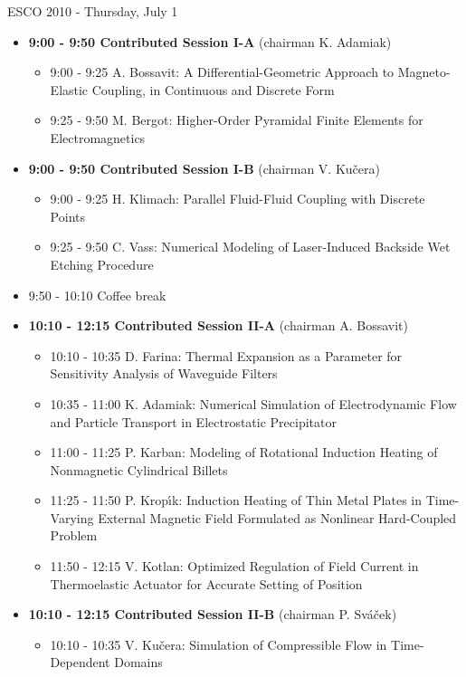 \documentclass[10pt, A4]{article}%
\begin{document}
\centerline{\huge ESCO 2010 - Thursday, July 1}
\vspace{4mm}

\begin{itemize}    
  \item {\bf 9:00 - 9:50 Contributed Session I-A} (chairman K. Adamiak) 
  \begin{itemize}
    \item 9:00 - 9:25 A. Bossavit: A Differential-Geometric Approach to Magneto-Elastic Coupling, 
in Continuous and Discrete Form
    \item 9:25 - 9:50 M. Bergot: Higher-Order Pyramidal Finite Elements for Electromagnetics
  \end{itemize}
  \item {\bf 9:00 - 9:50 Contributed Session I-B} (chairman V. Ku\v cera) 
  \begin{itemize}
    \item 9:00 - 9:25 H. Klimach: Parallel Fluid-Fluid Coupling with Discrete Points
    \item 9:25 - 9:50 C. Vass: Numerical Modeling  of  Laser-Induced  Backside  Wet  Etching Procedure
  \end{itemize}
  \item 9:50 - 10:10 Coffee break
  \item {\bf 10:10 - 12:15 Contributed Session II-A} (chairman A. Bossavit) 
  \begin{itemize}
    \item 10:10 - 10:35 D. Farina: Thermal Expansion as a Parameter for Sensitivity Analysis of Waveguide Filters
    \item 10:35 - 11:00 K. Adamiak: Numerical Simulation of Electrodynamic Flow and Particle Transport in Electrostatic Precipitator
    \item 11:00 - 11:25 P. Karban: Modeling of Rotational Induction Heating
of Nonmagnetic Cylindrical Billets
    \item 11:25 - 11:50 P. Krop\'{\i}k: Induction Heating of Thin Metal Plates
in Time-Varying External Magnetic Field
Formulated as Nonlinear Hard-Coupled Problem
    \item 11:50 - 12:15 V. Kotlan: Optimized Regulation of Field Current
in Thermoelastic Actuator for Accurate Setting of Position
  \end{itemize}
  \item {\bf 10:10 - 12:15 Contributed Session II-B} (chairman P. Sv\'a\v cek) 
  \begin{itemize}
    \item 10:10 - 10:35 V. Ku\v{c}era: Simulation of Compressible Flow in Time-Dependent Domains

\end{itemize}
\end{itemize}
\end{document}
